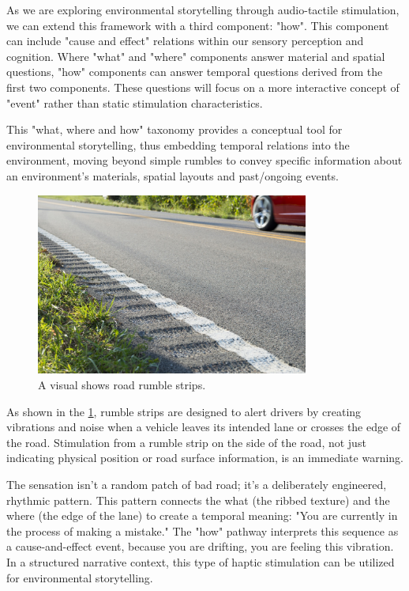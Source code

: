             As we are exploring environmental storytelling through audio-tactile stimulation, we can extend this framework with a third component: "how". This component can include "cause and effect" relations within our sensory perception and cognition. Where "what" and "where" components answer material and spatial questions, "how" components can answer temporal questions derived from the first two components. These questions will focus on a more interactive concept of "event" rather than static stimulation characteristics.\par

            This "what, where and how" taxonomy provides a conceptual tool for environmental storytelling, thus embedding temporal relations into the environment, moving beyond simple rumbles to convey specific information about an environment's materials, spatial layouts and past/ongoing events.\par

            \begin{figure}[H]
                \centering
                \includegraphics[width=0.8\textwidth]{images/rumble_strips.jpg}
                \caption{A visual shows road rumble strips.}
                \label{fig:RUMBLE_STRIP}
            \end{figure}

            As shown in the \ref{fig:RUMBLE_STRIP}, rumble strips are designed to alert drivers by creating vibrations and noise when a vehicle leaves its intended lane or crosses the edge of the road. Stimulation from a rumble strip on the side of the road, not just indicating physical position or road surface information, is an immediate warning.\par

            The sensation isn't a random patch of bad road; it's a deliberately engineered, rhythmic pattern. This pattern connects the what (the ribbed texture) and the where (the edge of the lane) to create a temporal meaning: "You are currently in the process of making a mistake." The "how" pathway interprets this sequence as a cause-and-effect event, because you are drifting, you are feeling this vibration. In a structured narrative context, this type of haptic stimulation can be utilized for environmental storytelling.\par
